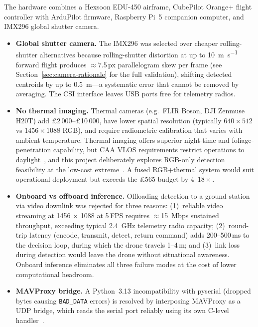 The hardware combines a Hexsoon EDU-450 airframe, CubePilot Orange+ flight controller with ArduPilot firmware, Raspberry Pi~5 companion computer, and IMX296 global shutter camera.

\begin{itemize}
    \item \textbf{Global shutter camera.} The IMX296 was selected over cheaper rolling-shutter alternatives because rolling-shutter distortion at up to \SI{10}{\metre\per\second} forward flight produces ${\approx}$7.5\,px parallelogram skew per frame (see Section~\ref{sec:camera-rationale} for the full validation), shifting detected centroids by up to \SI{0.5}{\metre}---a systematic error that cannot be removed by averaging. The CSI interface leaves USB ports free for telemetry radios.
    \item \textbf{No thermal imaging.} Thermal cameras (e.g.\ FLIR Boson, DJI Zenmuse H20T) add \pounds2\,000--\pounds10\,000, have lower spatial resolution (typically $640 \times 512$ vs $1456 \times 1088$ RGB), and require radiometric calibration that varies with ambient temperature. Thermal imaging offers superior night-time and foliage-penetration capability, but CAA VLOS requirements restrict operations to daylight~\cite{caa2024uas}, and this project deliberately explores RGB-only detection feasibility at the low-cost extreme~\cite{thermal_sar}. A fused RGB+thermal system would suit operational deployment but exceeds the \pounds565 budget by $4$--$18\times$.
    \item \textbf{Onboard vs offboard inference.} Offloading detection to a ground station via video downlink was rejected for three reasons: (1)~reliable video streaming at \SI{1456}{} $\times$ \SI{1088}{} at 5\,FPS requires ${\approx}$\SI{15}{Mbps} sustained throughput, exceeding typical \SI{2.4}{\giga\hertz} telemetry radio capacity; (2)~round-trip latency (encode, transmit, detect, return command) adds 200--500\,ms to the decision loop, during which the drone travels 1--4\,m; and (3)~link loss during detection would leave the drone without situational awareness. Onboard inference eliminates all three failure modes at the cost of lower computational headroom.
    \item \textbf{MAVProxy bridge.} A Python~3.13 incompatibility with pyserial (dropped bytes causing \texttt{BAD\_DATA} errors) is resolved by interposing MAVProxy as a UDP bridge, which reads the serial port reliably using its own C-level handler~\cite{mavproxy}.
\end{itemize}


